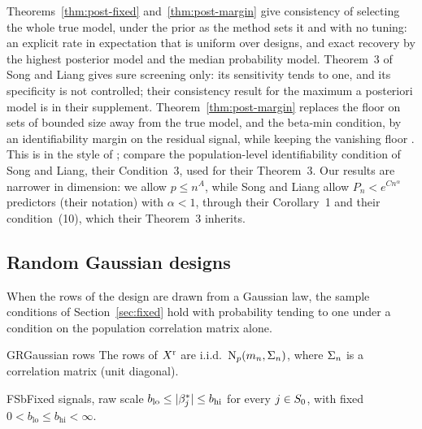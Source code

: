 \begin{remark}\label{rem:SL-fixed}
Theorems~\ref{thm:post-fixed} and~\ref{thm:post-margin} give consistency of selecting the whole true model, under the prior
as the method sets it and with no tuning: an explicit rate in expectation that is uniform over designs, and exact
recovery by the highest posterior model and the median probability model. Theorem~3 of Song and Liang gives sure
screening only: its sensitivity tends to one, and its specificity is not controlled; their consistency result for the
maximum a posteriori model is in their supplement. Theorem~\ref{thm:post-margin} replaces the floor  on sets of
bounded size away from the true model, and the beta-min condition, by an identifiability margin on the residual signal,
while keeping the vanishing floor . This is in the style of \citet{NarisettyHe2014}; compare the population-level
identifiability condition of Song and Liang, their Condition~3, used for their Theorem~3. Our results are narrower in
dimension: we allow $p\le n^A$, while Song and Liang allow $P_n<e^{Cn^\alpha}$ predictors (their notation) with $\alpha<1$, through their
Corollary~1 and their condition~(10), which their Theorem~3 inherits.
\end{remark}

\subsection{Random Gaussian designs}\label{sec:random}

When the rows of the design are drawn from a Gaussian law, the sample conditions of Section~\ref{sec:fixed} hold with
probability tending to one under a condition on the population correlation matrix alone.


\begin{assumption}{GR}{Gaussian rows}
The rows of $X^{\mathrm r}$ are i.i.d.\ $\mathrm{N}_p(m_n,\Sigma_n)$, where $\Sigma_n$ is a correlation matrix (unit diagonal).
\end{assumption}

\begin{assumption}{FSb}{Fixed signals, raw scale}
$b_{\mathrm{lo}}\le\lvert \beta^*_j\rvert\le b_{\mathrm{hi}}$ for every $j\in S_0$, with fixed $0<b_{\mathrm{lo}}\le b_{\mathrm{hi}}<\infty$.
\end{assumption}

